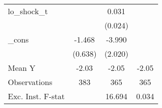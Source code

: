 {\begin{tabular}{l*{3}{c}}
\addlinespace
lo\_shock\_t  &                     &       0.031         &                     \\
            &                     &     (0.024)         &                     \\
\addlinespace
\_cons      &      -1.468\sym{**} &      -3.990\sym{*}  &                     \\
            &     (0.638)         &     (2.020)         &                     \\
\midrule
Mean Y      &       -2.03         &       -2.05         &       -2.05         \\
Observations&         383         &         365         &         365         \\
Exc. Inst. F-stat&                     &      16.694         &       0.034         \\
\bottomrule
\end{tabular}
}
